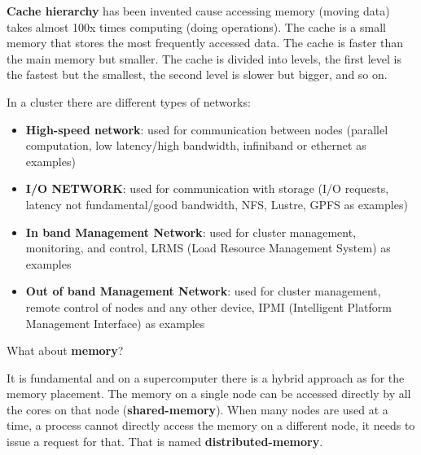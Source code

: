 \begin{tipsblock}
    \textbf{Cache hierarchy} has been invented cause accessing memory (moving data) takes almost 100x times computing (doing operations). The cache is a small memory that stores the most frequently accessed data. The cache is faster than the main memory but smaller. The cache is divided into levels, the first level is the fastest but the smallest, the second level is slower but bigger, and so on.
\end{tipsblock}

In a cluster there are different types of networks:
\begin{itemize}
    \item \textbf{High-speed network}: used for communication between nodes (parallel computation, low latency/high bandwidth, infiniband or ethernet as examples)
    \item \textbf{I/O NETWORK}: used for communication with storage (I/O requests, latency not fundamental/good bandwidth, NFS, Lustre, GPFS as examples)
    \item \textbf{In band Management Network}: used for cluster management, monitoring, and control, LRMS (Load Resource Management System) as examples
    \item \textbf{Out of band Management Network}: used for cluster management, remote control of nodes and any other device, IPMI (Intelligent Platform Management Interface) as examples
\end{itemize}

What about \textbf{memory}?

It is fundamental and on a supercomputer there is a hybrid approach as for the memory placement. 
The memory on a single node can be accessed directly by all the cores on that node (\textbf{shared-memory}). 
When many nodes are used at a time, a process cannot directly access the memory on a different node, it needs to issue a request for that. That is named \textbf{distributed-memory}.

